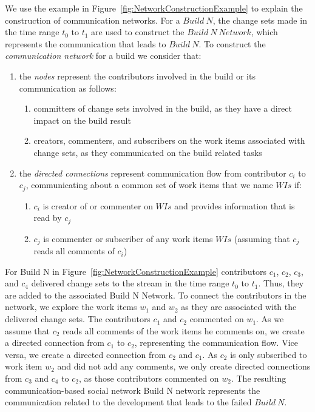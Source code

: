 We use the example in Figure~\ref{fig:NetworkConstructionExample} to explain the
construction of communication networks. For a $Build~N$, the change sets made in
the time range $t_0$ to $t_1$ are used to construct the $Build~N~Network$, which
represents the communication that leads to $Build~N$. To construct the
\emph{communication network} for a build we consider that:

\begin{enumerate}
  \item the \emph{nodes} represent the contributors involved in the build or 
 its communication as follows:
  \begin{enumerate}
    \item committers of change sets involved in the build, as they have a
    direct impact on the build result
    \item creators, commenters, and subscribers on the work items associated with
    change sets, as they communicated on the build related tasks
  \end{enumerate}
  \item the \emph{directed connections} represent communication flow
  from contributor $c_i$ to $c_j$, communicating about a common set of
  work items that we name $WIs$ if:
  \begin{enumerate}
    \item $c_i$ is creator of or commenter on $WIs$ and provides
    information that is read by $c_j$
    \item $c_j$ is commenter or subscriber of any work items $WIs$ (assuming
    that $c_j$ reads all comments of $c_i$)
  \end{enumerate}
\end{enumerate}

For Build N in Figure~\ref{fig:NetworkConstructionExample} contributors $c_1$,
$c_2$, $c_3$, and $c_4$ delivered change sets to the stream in the time range $t_0$
to $t_1$. Thus, they are added to the associated Build N Network. To connect the
contributors in the network, we explore the work items $w_1$ and $w_2$ as they
are associated with the delivered change sets. The contributors $c_1$ and $c_2$
commented on $w_1$. As we assume that $c_2$ reads all comments of the work items
he comments on, we create a directed connection from $c_1$ to $c_2$, representing
the communication flow. Vice versa, we create a directed connection from $c_2$
and $c_1$. As $c_2$ is only subscribed to work item $w_2$ and did not add any
comments, we only create directed connections from $c_3$ and $c_4$ to $c_2$, as
those contributors commented on $w_2$. The resulting communication-based social
network Build N network represents the communication related to the development
that leads to the failed $Build~N$.

